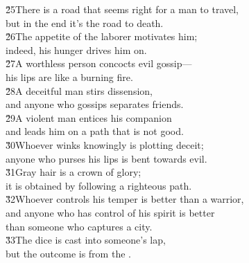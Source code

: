 \begin{poetry}
\poeml \v{25}There is a road that seems right for a man to travel, \\
\poemll    but in the end it's the road to death. \\
\poeml \v{26}The appetite of the laborer motivates him; \\
\poemll    indeed, his hunger drives him on. \\
\poeml \v{27}A worthless person concocts evil gossip--- \\
\poemll    his lips are like a burning fire. \\
\poeml \v{28}A deceitful man stirs dissension, \\
\poemll    and anyone who gossips separates friends. \\
\poeml \v{29}A violent man entices his companion \\
\poemll    and leads him on a path that is not good. \\
\poeml \v{30}Whoever winks knowingly is plotting deceit; \\
\poemll    anyone who purses his lips is bent towards evil. \\
\poeml \v{31}Gray hair is a crown of glory; \\
\poemll    it is obtained by following a righteous path. \\
\poeml \v{32}Whoever controls his temper is better than a warrior, \\
\poemll    and anyone who has control of his spirit is better \\
\poemlll       than someone who captures a city. \\
\poeml \v{33}The dice is cast into someone's lap, \\
\poemll    but the outcome is from the .
\end{poetry}

